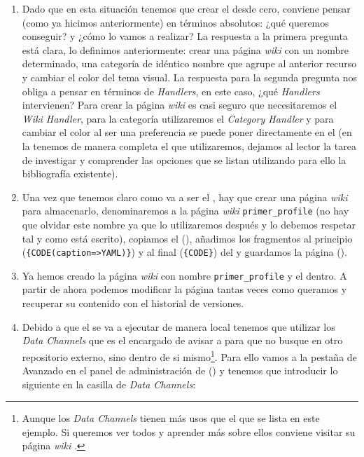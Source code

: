 \begin{enumerate}

    \item Dado que en esta situación tenemos que crear el \profile{} desde cero, conviene pensar (como ya hicimos anteriormente) en términos absolutos: ¿qué queremos conseguir? y ¿cómo lo vamos a realizar? La respuesta a la primera pregunta está clara, lo definimos anteriormente: crear una página \textit{wiki} con un nombre determinado, una categoría de idéntico nombre que agrupe al anterior recurso y cambiar el color del tema visual. La respuesta para la segunda pregunta nos obliga a pensar en términos de \textit{Handlers}, en este caso, ¿qué \textit{Handlers} intervienen? Para crear la página \textit{wiki} es casi seguro que necesitaremos el \textit{Wiki Handler}, para la categoría utilizaremos el \textit{Category Handler} y para cambiar el color al ser una preferencia se puede poner directamente en el \profile{} (en la  tenemos de manera completa el \profile{} que utilizaremos, dejamos al lector la tarea de investigar y comprender las opciones que se listan utilizando para ello la bibliografía existente).

\item Una vez que tenemos claro como va a ser el \profile{}, hay que crear una página \textit{wiki} para almacenarlo, denominaremos a la página \textit{wiki} \texttt{primer\_profile} (no hay que olvidar este nombre ya que lo utilizaremos después y lo debemos respetar tal y como está escrito), copiamos el \profile{} (), añadimos los fragmentos al principio (\texttt{\{CODE(caption=>YAML)\}}) y al final (\texttt{\{CODE\}}) del \profile{} y guardamos la página ().

\item Ya hemos creado la página \textit{wiki} con nombre \texttt{primer\_profile} y el \profile{} dentro. A partir de ahora podemos modificar la página tantas veces como queramos y recuperar su contenido con el historial de versiones.

\item Debido a que el \profile{} se va a ejecutar de manera local tenemos que utilizar los \textit{Data Channels} que es el encargado de avisar a \tiki{} para que no busque en otro repositorio externo, sino dentro de si mismo\footnote{Aunque los \textit{Data Channels} tienen más usos que el que se lista en este ejemplo. Si queremos ver todos y aprender más sobre ellos conviene visitar su página \textit{wiki} \cite{web:data-channels}.}. Para ello vamos a la pestaña de Avanzado en el panel de administración de \profiles{} () y tenemos que introducir lo siguiente en la casilla de \textit{Data Channels}:


\end{enumerate}
